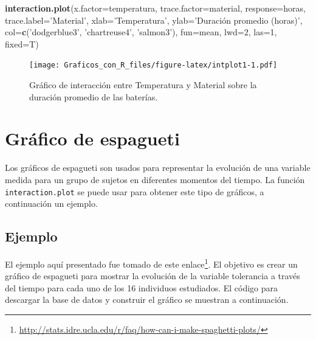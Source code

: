 \documentclass[10pt,]{krantz}
\makeatletter
\newenvironment{Shaded}{\begin{snugshade}}{\end{snugshade}}
\newcommand{\KeywordTok}[1]{\textcolor[rgb]{0.13,0.29,0.53}{\textbf{#1}}}
\newcommand{\DataTypeTok}[1]{\textcolor[rgb]{0.13,0.29,0.53}{#1}}
\newcommand{\DecValTok}[1]{\textcolor[rgb]{0.00,0.00,0.81}{#1}}
\newcommand{\StringTok}[1]{\textcolor[rgb]{0.31,0.60,0.02}{#1}}
\newcommand{\NormalTok}[1]{#1}
\renewcommand{\href}[2]{#2\footnote{\url{#1}}}
\newenvironment{kframe}{%
\medskip{}
\setlength{\fboxsep}{.8em}
 \def\at@end@of@kframe{}%
 \ifinner\ifhmode%
  \def\at@end@of@kframe{\end{minipage}}%
  \begin{minipage}{\columnwidth}%
 \fi\fi%
 \def\FrameCommand##1{\hskip\@totalleftmargin \hskip-\fboxsep
 \colorbox{shadecolor}{##1}\hskip-\fboxsep
     \hskip-\linewidth \hskip-\@totalleftmargin \hskip\columnwidth}%
 \MakeFramed {\advance\hsize-\width
   \@totalleftmargin\z@ \linewidth\hsize
   \@setminipage}}%
 {\par\unskip\endMakeFramed%
 \at@end@of@kframe}
\renewenvironment{Shaded}{\begin{kframe}}{\end{kframe}}
\makeatother
\begin{document}
\begin{Shaded}
\begin{Highlighting}[]
\KeywordTok{interaction.plot}\NormalTok{(}\DataTypeTok{x.factor=}\NormalTok{temperatura, }\DataTypeTok{trace.factor=}\NormalTok{material,}
                 \DataTypeTok{response=}\NormalTok{horas, }\DataTypeTok{trace.label=}\StringTok{'Material'}\NormalTok{,}
                 \DataTypeTok{xlab=}\StringTok{'Temperatura'}\NormalTok{,}
                 \DataTypeTok{ylab=}\StringTok{'Duración promedio (horas)'}\NormalTok{,}
                 \DataTypeTok{col=}\KeywordTok{c}\NormalTok{(}\StringTok{'dodgerblue3'}\NormalTok{, }\StringTok{'chartreuse4'}\NormalTok{, }\StringTok{'salmon3'}\NormalTok{),}
                 \DataTypeTok{fun=}\NormalTok{mean, }\DataTypeTok{lwd=}\DecValTok{2}\NormalTok{, }\DataTypeTok{las=}\DecValTok{1}\NormalTok{, }\DataTypeTok{fixed=}\NormalTok{T)}
\end{Highlighting}
\end{Shaded}

\begin{figure}
\centering
\texttt{[image: Graficos\_con\_R\_files/figure-latex/intplot1-1.pdf]}
\caption{\label{fig:intplot1}Gráfico de interacción entre Temperatura y
Material sobre la duración promedio de las baterías.}
\end{figure}

\section{\texorpdfstring{Gráfico de espagueti
}{Gráfico de espagueti }}\label{grafico-de-espagueti}

Los gráficos de espagueti son usados para representar la evolución de
una variable medida para un grupo de sujetos en diferentes momentos del
tiempo. La función \texttt{interaction.plot} se puede usar para obtener
este tipo de gráficos, a continuación un ejemplo.

\subsection*{Ejemplo}\label{ejemplo-27}


El ejemplo aquí presentado fue tomado de este
\href{http://stats.idre.ucla.edu/r/faq/how-can-i-make-spaghetti-plots/}{enlace}.
El objetivo es crear un gráfico de espagueti para mostrar la evolución
de la variable tolerancia a través del tiempo para cada uno de los 16
individuos estudiados. El código para descargar la base de datos y
construir el gráfico se muestran a continuación.
\end{document}
